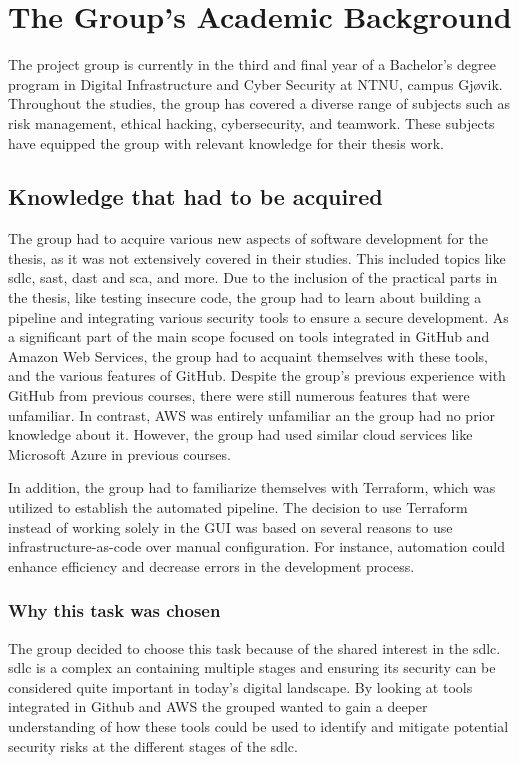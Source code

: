   

\section{The Group’s Academic Background}
The project group is currently in the third and final year of a Bachelor's degree program in Digital Infrastructure and Cyber Security at NTNU, campus Gjøvik. Throughout the studies, the group has covered a diverse range of subjects such as risk management, ethical hacking, cybersecurity, and teamwork. These subjects have equipped the group with relevant knowledge for their thesis work.

\subsection{Knowledge that had to be acquired}
\label{section: Knowledge that had to be acquired}
The group had to acquire various new aspects of software development for the thesis, as it was not extensively covered in their studies. This included topics like \acrshort{sdlc}, \acrlong{sast}, \acrlong{dast} and \acrlong{sca}, and more. Due to the inclusion of the practical parts in the thesis, like testing insecure code, the group had to learn about building a pipeline and integrating various security tools to ensure a secure development. As a significant part of the main scope focused on tools integrated in GitHub and Amazon Web Services, the group had to acquaint themselves with these tools, and the various features of GitHub. Despite the group's previous experience with GitHub from previous courses, there were still numerous features that were unfamiliar. In contrast, AWS was entirely unfamiliar an the group had no prior knowledge about it. However, the group had used similar cloud services like Microsoft Azure in previous courses.

In addition, the group had to familiarize themselves with Terraform, which was utilized to establish the automated pipeline. The decision to use Terraform instead of working solely in the GUI was based on several reasons to use infrastructure-as-code over manual configuration. For instance, automation could enhance efficiency and decrease errors in the development process.

\subsubsection{Why this task was chosen}
The group decided to choose this task because of the shared interest in the \acrlong{sdlc}. \acrshort{sdlc} is a complex an containing multiple stages and ensuring its security can be considered quite important in today's digital landscape. By looking at tools integrated in Github and AWS the grouped wanted to gain a deeper understanding of how these tools could be used to identify and mitigate potential security risks at the different stages of the \acrshort{sdlc}.


